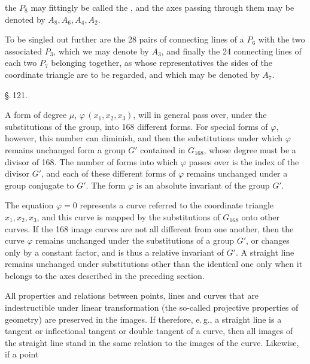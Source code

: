 
the $P_8$ may fittingly be called the , and the axes passing through them may be denoted by $A_8, A_6, A_4, A_2$.

To be singled out further are the 28 pairs of connecting lines of a $P_6$ with the two associated $P_3$, which we may denote by $A_3$, and finally the 24 connecting lines of each two $P_7$ belonging together, as whose representatives the sides of the coordinate triangle are to be regarded, and which may be denoted by $A_7$.

\begin{center}
\S.\,121.\\
\end{center}

A form of degree $\mu$, $\varphi\,(x_1, x_2, x_3)$, will in general pass over, under the substitutions of the group, into 168 different forms. For special forms of $\varphi$, however, this number can diminish, and then the substitutions under which $\varphi$ remains unchanged form a group $G'$ contained in $G_{168}$, whose degree must be a divisor of 168. The number of forms into which $\varphi$ passes over is the index of the divisor $G'$, and each of these different forms of $\varphi$ remains unchanged under a group conjugate to $G'$. The form $\varphi$ is an absolute invariant of the group $G'$.

The equation $\varphi = 0$ represents a curve referred to the coordinate triangle $x_1, x_2, x_3$, and this curve is mapped by the substitutions of $G_{168}$ onto other curves. If the 168 image curves are not all different from one another, then the curve $\varphi$ remains unchanged under the substitutions of a group $G'$, or changes only by a constant factor, and is thus a relative invariant of $G'$. A straight line remains unchanged under substitutions other than the identical one only when it belongs to the axes described in the preceding section.

All properties and relations between points, lines and curves that are indestructible under linear transformation (the so-called projective properties of geometry) are preserved in the images. If therefore, e.\,g., a straight line is a tangent or inflectional tangent or double tangent of a curve, then all images of the straight line stand in the same relation to the images of the curve. Likewise, if a point
